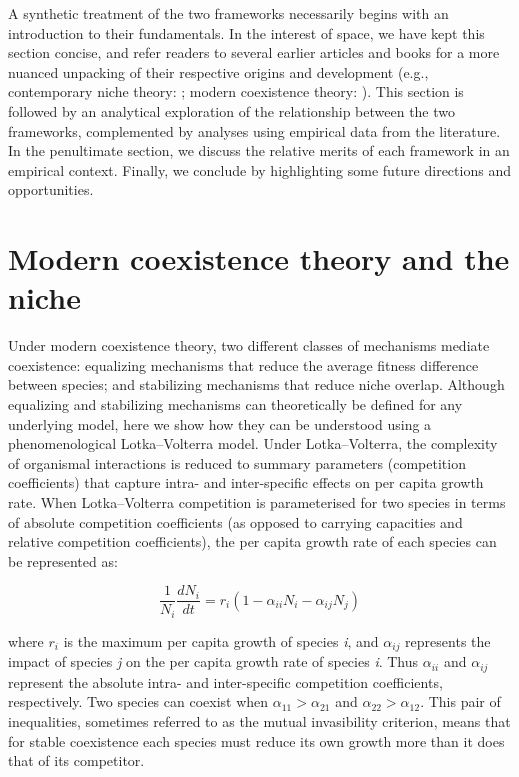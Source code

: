 A synthetic treatment of the two frameworks necessarily begins with an introduction to their fundamentals. In the interest of space, we have kept this section concise, and refer readers to several earlier articles and books for a more nuanced unpacking of their respective origins and development (e.g., contemporary niche theory: \citealp{tilman1982, Grover1997, Chase2003}; modern coexistence theory: \citealp{Chesson2000, Adler2007, Hillerislambers2012, Chesson2013ecosys}). This section is followed by an analytical exploration of the relationship between the two frameworks, complemented by analyses using empirical data from the literature. In the penultimate section, we discuss the relative merits of each framework in an empirical context. Finally, we conclude by highlighting some future directions and opportunities. 
\par



\section{Modern coexistence theory and the niche}
Under modern coexistence theory, two different classes of mechanisms mediate coexistence: equalizing mechanisms that reduce the average fitness difference between species; and stabilizing mechanisms that reduce niche overlap. Although equalizing and stabilizing mechanisms can theoretically be defined for any underlying model, here we show how they can be understood using a phenomenological Lotka--Volterra model. Under Lotka--Volterra, the complexity of organismal interactions is reduced to summary parameters (competition coefficients) that capture intra- and inter-specific effects on per capita growth rate. When Lotka--Volterra competition is parameterised for two species in terms of absolute competition coefficients (as opposed to carrying capacities and relative competition coefficients), the per capita growth rate of each species can be represented as:

\begin{equation}
\frac{1}{N_{i}}\frac{dN_{i}}{dt} = r_{i}(1 - \alpha_{ii}N_{i} - \alpha_{ij}N_{j}) 
\tag{2.1}\label{eq:2.1}
\end{equation}

\noindent where $r_{i}$ is the maximum per capita growth of species \textit{i}, and $\alpha_{ij}$ represents the impact of species \textit{j} on the per capita growth rate of species \textit{i}. Thus $\alpha_{ii}$ and $\alpha_{ij}$ represent the absolute intra- and inter-specific competition coefficients, respectively. Two species can coexist when $\alpha_{11} > \alpha_{21}$ and $\alpha_{22} > \alpha_{12}$. This pair of inequalities, sometimes referred to as the mutual invasibility criterion, means that for stable coexistence each species must reduce its own growth more than it does that of its competitor. 
\par


